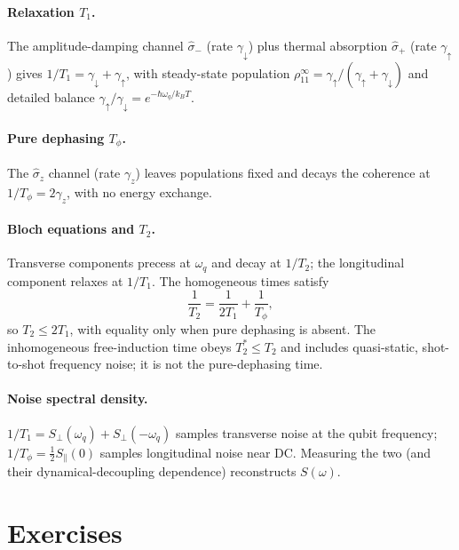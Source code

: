 \clearpage
\begin{chaptersummary}

\paragraph{Relaxation $T_1$.}
The amplitude-damping channel $\hat\sigma_-$ (rate
$\gamma_\downarrow$) plus thermal absorption $\hat\sigma_+$ (rate
$\gamma_\uparrow$) gives $1/T_1=\gamma_\downarrow+\gamma_\uparrow$,
with steady-state population
$\rho_{11}^\infty=\gamma_\uparrow/(\gamma_\uparrow+\gamma_\downarrow)$
and detailed balance
$\gamma_\uparrow/\gamma_\downarrow=e^{-\hbar\omega_q/k_BT}$.

\paragraph{Pure dephasing $T_\phi$.}
The $\hat\sigma_z$ channel (rate $\gamma_z$) leaves populations
fixed and decays the coherence at $1/T_\phi=2\gamma_z$, with no
energy exchange.

\paragraph{Bloch equations and $T_2$.}
Transverse components precess at $\omega_q$ and decay at $1/T_2$;
the longitudinal component relaxes at $1/T_1$. The homogeneous
times satisfy
\begin{equation}
\frac{1}{T_2} = \frac{1}{2T_1} + \frac{1}{T_\phi},
\end{equation}
so $T_2\leq 2T_1$, with equality only when pure dephasing is
absent. The inhomogeneous free-induction time obeys $T_2^*\leq T_2$
and includes quasi-static, shot-to-shot frequency noise; it is not
the pure-dephasing time.

\paragraph{Noise spectral density.}
$1/T_1=S_\perp(\omega_q)+S_\perp(-\omega_q)$ samples transverse
noise at the qubit frequency; $1/T_\phi=\tfrac12 S_\parallel(0)$
samples longitudinal noise near DC. Measuring the two (and their
dynamical-decoupling dependence) reconstructs $S(\omega)$.

\end{chaptersummary}

\section*{Exercises}

